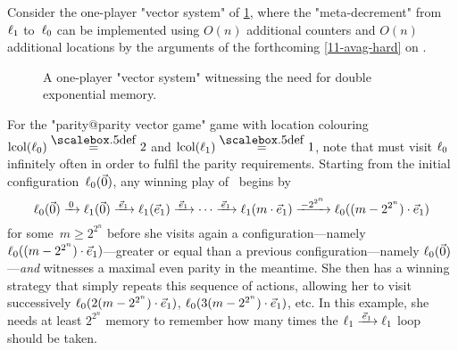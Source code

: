 
\begin{example}
  Consider the one-player "vector system" of \cref{11-fig-finitemem},
  where the "meta-decrement" from~$\ell_1$ to~$\ell_0$ can be
  implemented using $O(n)$ additional counters and $O(n)$ additional
  locations by the arguments of the forthcoming \cref{11-avag-hard}
  on .
  
  \begin{figure}[htbp]
    \centering
  \caption{\label{11-fig-finitemem} A one-player "vector system"
  witnessing the need for double exponential memory.}
  \end{figure}

  For the "parity@parity vector game" game with location colouring
  $\lcol(\loc_0)\eqdef 2$ and $\lcol(\loc_1)\eqdef 1$, note that \Eve
  must visit $\ell_0$ infinitely often in order to fulfil the parity
  requirements.  Starting from the initial
  configuration~$\ell_0(\vec 0)$, any winning play of \Eve\ begins
  by \begin{equation*} \loc_0(\vec 0)\step{0}\loc_1(\vec 0)\step{\vec
      e_1}\loc_1(\vec e_1)\step{\vec e_1}\cdots\step{\vec
      e_1}\loc_1(m\cdot\vec
    e_1)\mstep{-2^{2^n}}\loc_0((m-2^{2^n})\cdot\vec
    e_1) \end{equation*} for some~$m\geq 2^{2^n}$ before she visits
  again a
  configuration---namely~$\ell_0((m-2^{2^n})\cdot\vec e_1)$---greater
  or equal than a previous configuration---namely
  $\ell_0(\vec 0)$---\emph{and} witnesses a maximal even parity in the
  meantime.  She then has a winning strategy that simply repeats this
  sequence of actions, allowing her to visit successively
  $\ell_0(2(m-2^{2^n})\cdot\vec e_1)$,
  $\ell_0(3(m-2^{2^n})\cdot\vec e_1)$, etc.  In this example, she
  needs at least $2^{2^n}$ memory to remember how many times the
  $\loc_1\step{\vec e_1}\loc_1$ loop should be taken.
\end{example}

